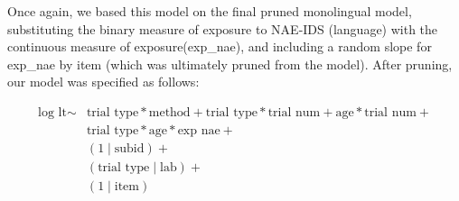 \documentclass[
  english,
  ,man,floatsintext]{apa6}
\begin{document}
Once again, we based this model on the final pruned monolingual model, substituting the binary measure of exposure to NAE-IDS (language) with the continuous measure of exposure(exp\_nae), and including a random slope for exp\_nae by item (which was ultimately pruned from the model). After pruning, our model was specified as follows:

\begin{equation}
\begin{split}
\text{log lt} \sim & \text{trial type} * \text{method} + \text{trial type} * \text{trial num} + \text{age} * \text{trial num} + \\
& \text{trial type} * \text{age} * \text{exp nae} + \\
& (1\mid \text{subid}) + \\
& (\text{trial type} \mid \text{lab}) + \\
& (1 \mid \text{item})
\end{split}
\end{equation}
\end{document}
